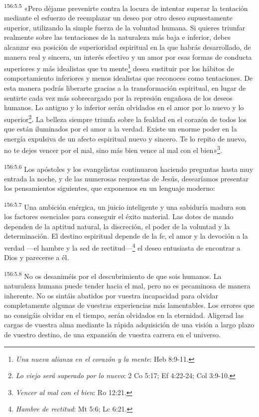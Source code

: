 \par 
\textsuperscript{156:5.5} «Pero déjame prevenirte contra la locura de intentar superar la tentación mediante el esfuerzo de reemplazar un deseo por otro deseo supuestamente superior, utilizando la simple fuerza de la voluntad humana. Si quieres triunfar realmente sobre las tentaciones de la naturaleza más baja e inferior, debes alcanzar esa posición de superioridad espiritual en la que habrás desarrollado, de manera real y sincera, un interés efectivo y un amor por esas formas de conducta superiores y más idealistas que tu mente\footnote{\textit{Una nueva alianza en el corazón y la mente}: Heb 8:9-11.} desea sustituir por los hábitos de comportamiento inferiores y menos idealistas que reconoces como tentaciones. De esta manera podrás liberarte gracias a la transformación espiritual, en lugar de sentirte cada vez más sobrecargado por la represión engañosa de los deseos humanos. Lo antiguo y lo inferior serán olvidados en el amor por lo nuevo y lo superior\footnote{\textit{Lo viejo será superado por lo nuevo}: 2 Co 5:17; Ef 4:22-24; Col 3:9-10.}. La belleza siempre triunfa sobre la fealdad en el corazón de todos los que están iluminados por el amor a la verdad. Existe un enorme poder en la energía expulsiva de un afecto espiritual nuevo y sincero. Te lo repito de nuevo, no te dejes vencer por el mal, sino más bien vence al mal con el bien»\footnote{\textit{Vencer al mal con el bien}: Ro 12:21.}.

\par 
\textsuperscript{156:5.6} Los apóstoles y los evangelistas continuaron haciendo preguntas hasta muy entrada la noche, y de las numerosas respuestas de Jesús, desearíamos presentar los pensamientos siguientes, que exponemos en un lenguaje moderno:

\par 
\textsuperscript{156:5.7} Una ambición enérgica, un juicio inteligente y una sabiduría madura son los factores esenciales para conseguir el éxito material. Las dotes de mando dependen de la aptitud natural, la discreción, el poder de la voluntad y la determinación. El destino espiritual depende de la fe, el amor y la devoción a la verdad ---el hambre y la sed de rectitud---\footnote{\textit{Hambre de rectitud}: Mt 5:6; Lc 6:21.} el deseo entusiasta de encontrar a Dios y parecerse a él.

\par 
\textsuperscript{156:5.8} No os desaniméis por el descubrimiento de que sois humanos. La naturaleza humana puede tender hacia el mal, pero no es pecaminosa de manera inherente. No os sintáis abatidos por vuestra incapacidad para olvidar completamente algunas de vuestras experiencias más lamentables. Los errores que no consigáis olvidar en el tiempo, serán olvidados en la eternidad. Aligerad las cargas de vuestra alma mediante la rápida adquisición de una visión a largo plazo de vuestro destino, de una expansión de vuestra carrera en el universo.

